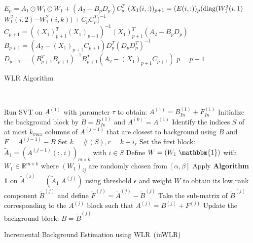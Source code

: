 \documentclass[10pt,twocolumn,letterpaper]{article}
\begin{document}
\begin{algorithm}
    \SetAlgoLined
    \nl{}
    \nl{}
    \nl {}
    {
        \nl $E_p=A_1\odot W_1\odot W_1+(A_2-B_pD_p)C_p^T$\;
        \nl {}
        {
            \nl $(X_1(i,:))_{p+1}=(E(i,:))_p({\rm diag}(W_1^2(i,1)$ $W_1^2(i,2)\cdots W_1^2(i,k))+C_pC_p^T)^{-1}$\;
        }
        \nl $C_{p+1}=((X_1)_{p+1}^T(X_1)_{p+1})^{-1}(X_1)_{p+1}^T(A_2-B_pD_p)$\;
        \nl $B_{p+1}=(A_2-(X_1)_{p+1}C_{p+1})D_p^T(D_pD_p^T)^{-1}$\;
        \nl $D_{p+1}=(B_{p+1}^TB_{p+1})^{-1}B_{p+1}^T(A_2-(X_1)_{p+1}C_{p+1})$\;
        \nl $p=p+1$\;
    }
    \nl {}
    \caption{WLR Algorithm}\label{wlr}
\end{algorithm}
~\\[-0.2in]
\begin{algorithm}
    \SetAlgoLined
    \nl{}
    \nl Run SVT on $A^{(1)}$ with parameter $\tau$ to obtain: $A^{(1)}=B^{(1)}_{In}+F^{(1)}_{In}$\;
    \nl Initialize the background block by $B=B^{(1)}_{In}$ and $A^{(0)}=A^{(1)}$\;
    \nl {}
    {
    \nl Identify the indices $S$ of at most $k_{max}$ columns of $A^{(j-1)}$ that are closest to background using $B$ and
    $F=A^{(j-1)}-B$\;
    \nl Set $k=\#(S), r = k+i_r$\;
    \nl Set the first block:~$\tilde{A}_1= (A^{(j-1)}(:,i))_{m\times k}$ with $i\in S$\;
    \nl Define $W=(W_1\;\mathbbm{1})$ with $W_1\in\mathbb{R}^{m\times k}$ where $(W_1)_{ij}$ are randomly chosen
    from $[\alpha, \beta]$\;
    \nl Apply {\bf Algorithm 1} on $\tilde{A}^{(j)}=(\tilde{A}_1\;A^{(j)})$ using threshold $\epsilon$ and weight $W$ to obtain its
    low rank component $\tilde{B}^{(j)}$ and define $\tilde{F}^{(j)}=\tilde{A}^{(j)}-\tilde{B}^{(j)}$\;
    \nl Take the sub-matrix of $\tilde{B}^{(j)}$ corresponding to the $A^{(j)}$ block such that $A^{(j)}=B^{(j)}+F^{(j)}$\;
    \nl Update the background block: $B=\tilde{B}^{(j)}$\;
    }
    \nl {}
    \caption{Incremental Background Estimation using WLR~(inWLR)}\label{inwlr}
\end{algorithm}
~\\[-0.2in]
\end{document}

